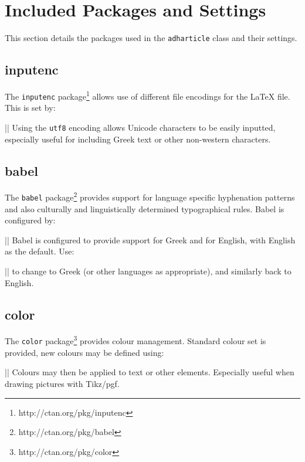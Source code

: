 \documentclass[electronic]{adharticle} %
\begin{document}

\section{Included Packages and Settings}


This section details the packages used in the \texttt{adharticle} class and
their settings.

\subsection{inputenc}

The \texttt{inputenc} package\footnote{http://ctan.org/pkg/inputenc} allows use
of different file encodings for the LaTeX file. This is set by:

\latex|\RequirePackage[utf8]{inputenc}|
Using the \texttt{utf8} encoding allows Unicode characters to be easily
inputted, especially useful for including Greek text or other non-western
characters.

\subsection{babel}

The \texttt{babel} package\footnote{http://ctan.org/pkg/babel} provides support
for language specific hyphenation patterns and also culturally and
linguistically determined typographical rules. Babel is configured by:

\latex||
Babel is configured to provide support for Greek and for English, with English
as the default. Use:

\latex||
to change to Greek (or other languages as appropriate), and similarly back to
English.

\subsection{color}

The \texttt{color} package\footnote{http://ctan.org/pkg/color} provides colour
management. Standard colour set is provided, new colours may be defined using:

\latex||
Colours may then be applied to text or other elements. Especially useful when
drawing pictures with Tikz/pgf.
\end{document}
